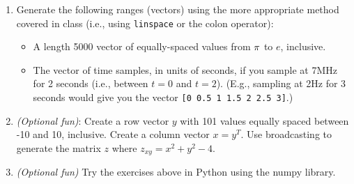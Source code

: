 \documentclass{article}
\begin{document}
\begin{enumerate}
		\item Generate the following ranges (vectors) using the more appropriate method covered in class (i.e., using \lstinline|linspace| or the colon operator):
		\begin{itemize}
			\item A length 5000 vector of equally-spaced values from $\-\pi$ to $e$, inclusive.
			\item The vector of time samples, in units of seconds, if you sample at 7MHz for 2 seconds (i.e., between $t=0$ and $t=2$). (E.g., sampling at 2Hz for 3 seconds would give you the vector \lstinline|[0 0.5 1 1.5 2 2.5 3]|.)
		\end{itemize}
	
		\item \textit{(Optional fun)}: Create a row vector $y$ with 101 values equally spaced between -10 and 10, inclusive. Create a column vector $x=y^T$. Use broadcasting to generate the matrix $z$ where $z_{xy}=x^2+y^2-4$.
	
		\item \textit{(Optional fun)} Try the exercises above in Python using the numpy library.
	\end{enumerate}
\end{document}
